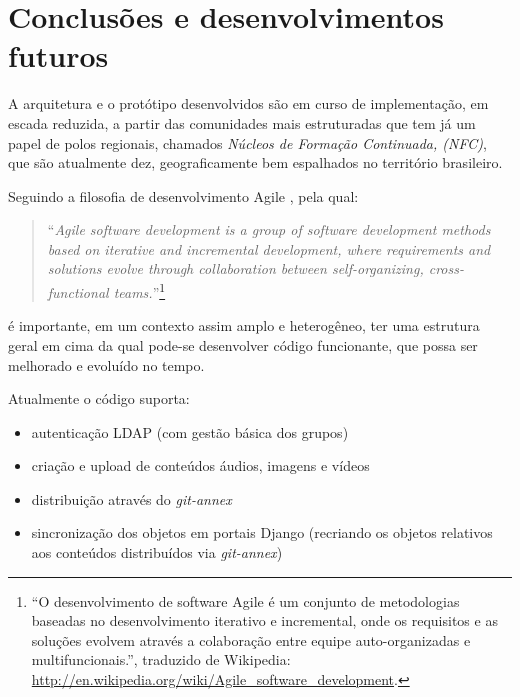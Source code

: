 
\chapter{Conclusões e desenvolvimentos futuros}
\label{Capitulo5}

A arquitetura e o protótipo desenvolvidos são em curso de
implementação, em escada reduzida, a partir das comunidades mais
estruturadas que tem já um papel de polos regionais, chamados
\emph{Núcleos de Formação Continuada, (NFC)}, que são atualmente dez,
geograficamente bem espalhados no território brasileiro.

Seguindo a filosofia de desenvolvimento Agile \citep{Agile}, pela qual: 

\begin{quote}
  ``\emph{Agile software development is a group of software
    development methods based on iterative and incremental
    development, where requirements and solutions evolve through
    collaboration between self-organizing, cross-functional
    teams.}''\footnote{``O desenvolvimento de software Agile é um
    conjunto de metodologias baseadas no desenvolvimento iterativo e
    incremental, onde os requisitos e as soluções evolvem através a
    colaboração entre equipe auto-organizadas e multifuncionais.'',
    traduzido de Wikipedia:
    \url{http://en.wikipedia.org/wiki/Agile_software_development}.}
\end{quote}

é importante, em um contexto assim amplo e heterogêneo, ter uma
estrutura geral em cima da qual pode-se desenvolver código funcionante,
que possa ser melhorado e evoluído no tempo.

Atualmente o código suporta:
\begin{itemize}
\item autenticação LDAP (com gestão básica dos grupos)
\item criação e upload de conteúdos áudios, imagens e vídeos
\item distribuição através do \emph{git-annex}
\item sincronização dos objetos em portais Django (recriando os
  objetos relativos aos conteúdos distribuídos via \emph{git-annex})
\end{itemize}

